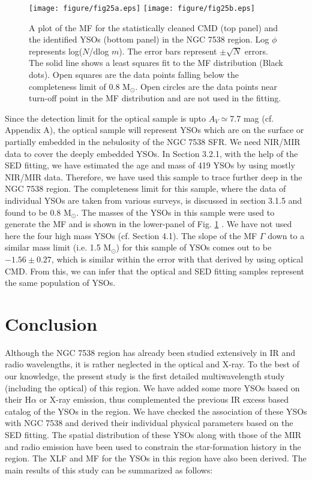 \documentclass[a4paper,fleqn,usenatbib,useAMS]{mnras}
\begin{document}
\begin{figure}
\texttt{[image: figure/fig25a.eps]}
\texttt{[image: figure/fig25b.eps]}
\caption{\label{mf} A plot of the MF for the statistically cleaned CMD (top panel) and
the identified YSOs (bottom panel) in the NGC 7538 region.
Log $\phi$ represents log($N$/dlog $m$). The error bars represent $\pm\sqrt N$ errors. The solid line shows a least
squares fit to the MF distribution (Black dots).
Open squares are the data points falling below the completeness limit of 0.8 M$_\odot$.
Open circles are the data points near turn-off point in the MF distribution and are not used in the fitting.
}
\end{figure}


Since the detection limit for the optical sample is upto $A_V\simeq$7.7 mag (cf. Appendix A), the optical sample
will represent YSOs which are on the surface or partially embedded in the nebulosity of the NGC 7538 SFR.
We need NIR/MIR data to cover the deeply embedded YSOs. In Section 3.2.1, with the help of the SED fitting, 
we have estimated the age and mass  of 419 YSOs by using mostly NIR/MIR data. Therefore, we have used this sample
to trace further deep in the NGC 7538 region. 
The completeness limit for this sample, where the data of individual YSOs are taken from various surveys,
is discussed in section 3.1.5 and found to be 0.8 M$_\odot$.
The masses of the YSOs in this sample were used to generate the MF and is shown in the lower-panel of Fig. \ref{mf}
\citep[see also,][]{2014A&A...567A.109K,2016MNRAS.461.2502Y}.
We have not used here the four high mass YSOs (cf. Section 4.1).
The slope of the MF $\Gamma$ down to a similar mass limit (i.e. 1.5 M$_\odot$) for this sample of YSOs
comes out to be $-1.56\pm0.27$, which is similar within the error with that derived by using optical CMD. 
From this, we can infer that the optical and SED fitting samples represent the same population of YSOs.


\section{Conclusion}

Although the NGC 7538 region has already been studied extensively in IR and radio wavelengths,
it is rather neglected in the optical and X-ray. 
To the best of our knowledge, the present study is the first detailed multiwavelength 
study  (including the optical) of this region. 
We have added some more YSOs based on their H$\alpha$ or X-ray emission, thus complemented
the previous IR excess based  catalog of the YSOs in the region. 
We have checked the association of these YSOs with NGC 7538 and derived their individual physical 
parameters based on the SED fitting.
The spatial distribution of these YSOs along with those of the MIR and radio emission have been used to constrain the star-formation history  in the region.
The XLF and MF for the YSOs in this region have also been derived.
The main results of this study can be summarized as follows:
\end{document}
